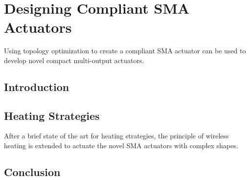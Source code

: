 
\chapter{Designing Compliant SMA Actuators}
Using topology optimization to create a compliant SMA actuator can be used to develop novel compact multi-output actuators.

\section{Introduction}

\section{Heating Strategies}
After a brief state of the art for heating strategies, the principle of wireless heating is extended to actuate the novel SMA actuators with complex shapes.
\section{Conclusion}

